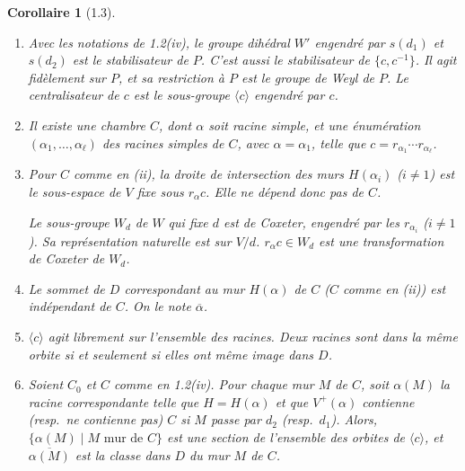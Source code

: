 \documentclass[11pt,a4paper]{article}
\theoremstyle{plain}
\newtheorem{corollary}[theorem]{Corollaire}
\theoremstyle{definition}
\begin{document}
\begin{corollary}[1.3]
\leavevmode
\begin{enumerate}[label=\textup{(\roman*)}]
\item Avec les notations de \textup{1.2(iv)}, le groupe dih\'edral $W'$ engendr\'e par $s(d_1)$ et $s(d_2)$ est le stabilisateur de $P$. C'est aussi le stabilisateur de $\{c, c^{-1}\}$. Il agit fid\`element sur $P$, et sa restriction \`a $P$ est le groupe de Weyl de $P$. Le centralisateur de $c$ est le sous-groupe $\langle c \rangle$ engendr\'e par $c$.

\item Il existe une chambre $C$, dont $\alpha$ soit racine simple, et une \'enum\'eration $(\alpha_1, \ldots, \alpha_\ell)$ des racines simples de $C$, avec $\alpha = \alpha_1$, telle que $c = r_{\alpha_1} \cdots r_{\alpha_\ell}$.

\item Pour $C$ comme en \textup{(ii)}, la droite de intersection des murs $H(\alpha_i)$ ($i \neq 1$) est le sous-espace de $V$ fixe sous $r_\alpha c$. Elle ne d\'epend donc pas de $C$.

Le sous-groupe $W_d$ de $W$ qui fixe $d$ est de Coxeter, engendr\'e par les $r_{\alpha_i}$ ($i \neq 1$). Sa repr\'esentation naturelle est sur $V/d$. $r_\alpha c \in W_d$ est une transformation de Coxeter de $W_d$.

\item Le sommet de $D$ correspondant au mur $H(\alpha)$ de $C$ ($C$ comme en \textup{(ii)}) est ind\'ependant de $C$. On le note $\overline{\alpha}$.

\item $\langle c \rangle$ agit librement sur l'ensemble des racines. Deux racines sont dans la m\^eme orbite si et seulement si elles ont m\^eme image dans $D$.

\item Soient $C_0$ et $C$ comme en \textup{1.2(iv)}. Pour chaque mur $M$ de $C$, soit $\alpha(M)$ la racine correspondante telle que $H = H(\alpha)$ et que $V^{+}(\alpha)$ contienne (resp.\ ne contienne pas) $C$ si $M$ passe par $d_2$ (resp.\ $d_1$). Alors, $\{\alpha(M) \mid M \text{ mur de } C\}$ est une section de l'ensemble des orbites de $\langle c \rangle$, et $\overline{\alpha(M)}$ est la classe dans $D$ du mur $M$ de $C$.
\end{enumerate}
\end{corollary}
\end{document}
